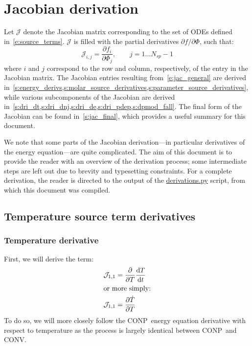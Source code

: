 \documentclass[12pt,number,sort&compress]{elsarticle}
\newcommand{\ns}{N_{sp}}
\newcommand{\conp}{CONP}
\newcommand{\conv}{CONV}
\begin{document}
\section{Jacobian derivation}

Let $\mathcal{J}$ denote the Jacobian matrix corresponding to the set of ODEs defined in~\cref{e:source_terms}.
$\mathcal{J}$ is filled with the partial derivatives $\partial f / \partial \Phi$, such that:
\begin{equation}
 \label{e:jac_general}
 \mathcal{J}_{i,j} = \frac{\partial f_i}{\partial \Phi_j},\qquad j=1 \ldots \ns - 1
\end{equation}
where $i$ and $j$ correspond to the row and column, respectively, of the entry in the Jacobian matrix.
The Jacobian entries resulting from~\cref{e:jac_general} are derived in~\cref{s:energy_derivs,s:molar_source_derivatives,s:parameter_source_derivatives}, while various subcomponents of the Jacobian are derived in~\cref{s:dri_dt,s:dri_dnj,s:dri_de,s:dri_pdep,s:dpmod_fall}.
The final form of the Jacobian can be found in~\cref{s:jac_final}, which provides a useful summary for this document.

We note that some parts of the Jacobian derivation---in particular derivatives of the energy equation---are quite complicated.
The aim of this document is to provide the reader with an overview of the derivation process; some intermediate steps are left out due to brevity and typesetting constraints.
For a complete derivation, the reader is directed to the output of the \href{https://github.com/arghdos/SPyJac-paper/blob/master/derivations/scripts/derivations.py}{derivations.py} script, from which this document was compiled.

\subsection{Temperature source term derivatives}
\label{s:energy_derivs}
\subsubsection{Temperature derivative}
\label{s:denergy_dt}
First, we will derive the term:
\begin{align}
 \mathcal{J}_{1,1} &= \frac{\partial}{\partial T} \frac{\text{d} T}{\text{d} t} \nonumber \\
 \intertext{or more simply:}
 \mathcal{J}_{1,1} &= \frac{\partial\dot{T}}{\partial{T}}
\end{align}
To do so, we will more closely follow the \conp~energy equation derivative with respect to temperature as the process is largely identical between \conp~and \conv.
\end{document}
